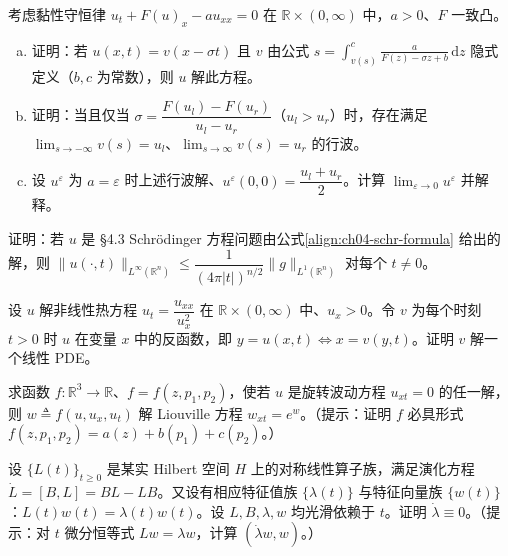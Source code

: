 \documentclass[../../main.tex]{subfiles}
\begin{document}
\begin{exercise}\label{exercise:ch04-07}
考虑黏性守恒律 $u_t+F(u)_x-au_{xx}=0$ 在 $\mathbb{R}\times(0,\infty)$ 中，$a>0$、$F$ 一致凸。
\begin{enumerate}[(a)]
\item 证明：若 $u(x,t)=v(x-\sigma t)$ 且 $v$ 由公式 $s=\displaystyle\int_{v(s)}^c\frac{a}{F(z)-\sigma z+b}\,\mathrm{d}z$ 隐式定义（$b,c$ 为常数），则 $u$ 解此方程。
\item 证明：当且仅当 $\sigma=\dfrac{F(u_l)-F(u_r)}{u_l-u_r}$（$u_l>u_r$）时，存在满足 $\lim_{s\to-\infty}v(s)=u_l$、$\lim_{s\to\infty}v(s)=u_r$ 的行波。
\item 设 $u^\varepsilon$ 为 $a=\varepsilon$ 时上述行波解、$u^\varepsilon(0,0)=\dfrac{u_l+u_r}{2}$。计算 $\lim_{\varepsilon\to 0}u^\varepsilon$ 并解释。
\end{enumerate}
\end{exercise}

\begin{exercise}\label{exercise:ch04-08}
证明：若 $u$ 是 \S4.3 Schrödinger 方程问题由公式\eqref{align:ch04-schr-formula} 给出的解，则 $\|u(\cdot,t)\|_{L^\infty(\mathbb{R}^n)}\leqslant\dfrac{1}{(4\pi|t|)^{n/2}}\|g\|_{L^1(\mathbb{R}^n)}$ 对每个 $t\neq 0$。
\end{exercise}

\begin{exercise}\label{exercise:ch04-09}
设 $u$ 解非线性热方程 $u_t=\dfrac{u_{xx}}{u_x^2}$ 在 $\mathbb{R}\times(0,\infty)$ 中、$u_x>0$。令 $v$ 为每个时刻 $t>0$ 时 $u$ 在变量 $x$ 中的反函数，即 $y=u(x,t)\iff x=v(y,t)$。证明 $v$ 解一个线性 PDE。
\end{exercise}

\begin{exercise}\label{exercise:ch04-10}
求函数 $f:\mathbb{R}^3\to\mathbb{R}$、$f=f(z,p_1,p_2)$，使若 $u$ 是旋转波动方程 $u_{xt}=0$ 的任一解，则 $w\triangleq f(u,u_x,u_t)$ 解 Liouville 方程 $w_{xt}=e^w$。（提示：证明 $f$ 必具形式 $f(z,p_1,p_2)=a(z)+b(p_1)+c(p_2)$。）
\end{exercise}

\begin{exercise}[Lax 对]\label{exercise:ch04-11}设 $\{L(t)\}_{t\geqslant 0}$ 是某实 Hilbert 空间 $H$ 上的对称线性算子族，满足演化方程 $\dot L=[B,L]=BL-LB$。又设有相应特征值族 $\{\lambda(t)\}$ 与特征向量族 $\{w(t)\}$：$L(t)w(t)=\lambda(t)w(t)$。设 $L,B,\lambda,w$ 均光滑依赖于 $t$。证明 $\dot\lambda\equiv 0$。（提示：对 $t$ 微分恒等式 $Lw=\lambda w$，计算 $(\dot\lambda w,w)$。）
\end{exercise}
\end{document}
